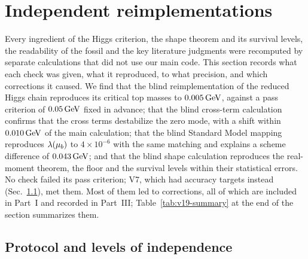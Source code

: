 
\section{Independent reimplementations}\label{rep:v-blind}

Every ingredient of the Higgs criterion, the shape theorem and its survival levels, the readability of the fossil and the key literature judgments were recomputed by separate calculations that did not use our main code.
This section records what each check was given, what it reproduced, to what precision, and which corrections it caused.
We find that the blind reimplementation of the reduced Higgs chain reproduces its critical top masses to $0.005\,\mathrm{GeV}$, against a pass criterion of $0.05\,\mathrm{GeV}$ fixed in advance; that the blind cross-term calculation confirms that the cross terms destabilize the zero mode, with a shift within $0.010\,\mathrm{GeV}$ of the main calculation; that the blind Standard Model mapping reproduces $\lambda(\mu_b)$ to $4\times10^{-6}$ with the same matching and explains a scheme difference of $0.043\,\mathrm{GeV}$; and that the blind shape calculation reproduces the real-moment theorem, the floor and the survival levels within their statistical errors. %
No check failed its pass criterion; V7, which had accuracy targets instead (Sec.~\ref{sec:v19-protocol}), met them.
Most of them led to corrections, all of which are included in Part~I and recorded in Part~III; Table~\ref{tab:v19-summary} at the end of the section summarizes them.

\subsection{Protocol and levels of independence}\label{sec:v19-protocol}

